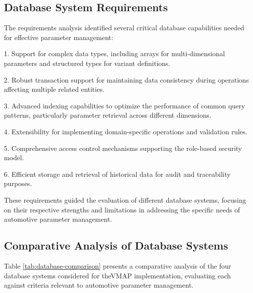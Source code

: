 \subsection{Database System Requirements}
\label{subsec:database-requirements}

The requirements analysis identified several critical database capabilities needed for effective parameter management:

1. Support for complex data types, including arrays for multi-dimensional parameters and structured types for variant definitions.

2. Robust transaction support for maintaining data consistency during operations affecting multiple related entities.

3. Advanced indexing capabilities to optimize the performance of common query patterns, particularly parameter retrieval across different dimensions.

4. Extensibility for implementing domain-specific operations and validation rules.

5. Comprehensive access control mechanisms supporting the role-based security model.

6. Efficient storage and retrieval of historical data for audit and traceability purposes.

These requirements guided the evaluation of different database systems, focusing on their respective strengths and limitations in addressing the specific needs of automotive parameter management.

\subsection{Comparative Analysis of Database Systems}
\label{subsec:database-comparison}

Table \ref{tab:database-comparison} presents a comparative analysis of the four database systems considered for the\ac{VMAP} implementation, evaluating each against criteria relevant to automotive parameter management.

